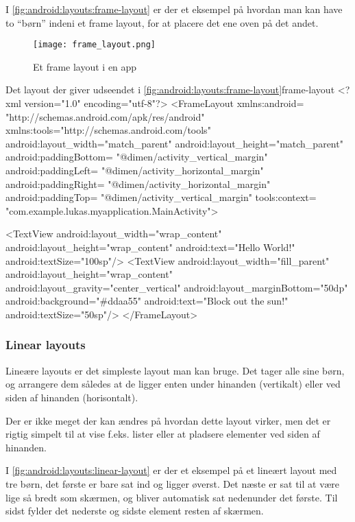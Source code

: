 I \autoref{fig:android:layouts:frame-layout} er der et eksempel på hvordan man 
kan have to ``børn'' indeni et frame layout, for at placere det ene oven på det 
andet.

\begin{figure}[h]
	\begin{center}
		\texttt{[image: frame\_layout.png]}
		\caption{Et frame layout i en app}
		\label{fig:android:layouts:frame-layout}
	\end{center}
\end{figure}

\clearpage

\begin{XmlCode}{Det layout der giver udseendet i \autoref{fig:android:layouts:frame-layout}}{frame-layout}
	<?xml version="1.0" encoding="utf-8"?>
	<FrameLayout 
		xmlns:android=
			"http://schemas.android.com/apk/res/android"
		xmlns:tools="http://schemas.android.com/tools"
		android:layout_width="match_parent"
		android:layout_height="match_parent"
		android:paddingBottom=
			"@dimen/activity_vertical_margin"
		android:paddingLeft=
			"@dimen/activity_horizontal_margin"
		android:paddingRight=
			"@dimen/activity_horizontal_margin"
		android:paddingTop=
			"@dimen/activity_vertical_margin"
		tools:context=
			"com.example.lukas.myapplication.MainActivity">
	
		<TextView
			android:layout_width="wrap_content"
			android:layout_height="wrap_content"
			android:text="Hello World!"
			android:textSize="100sp"/>
		<TextView
			android:layout_width="fill_parent"
			android:layout_height="wrap_content"
			android:layout_gravity="center_vertical"
			android:layout_marginBottom="50dp"
			android:background="#ddaa55"
			android:text="Block out the sun!"
			android:textSize="50sp"/>
	</FrameLayout>
\end{XmlCode}

\subsubsection{Linear layouts}
Lineære layouts er det simpleste layout man kan bruge. Det tager alle sine 
børn, og arrangere dem således at de ligger enten under hinanden (vertikalt) 
eller ved siden af hinanden (horisontalt).

Der er ikke meget der kan ændres på hvordan dette layout virker, men det er 
rigtig simpelt til at vise f.eks. lister eller at pladsere elementer ved siden 
af hinanden.

I \autoref{fig:android:layouts:linear-layout} er der et eksempel på et lineært 
layout med tre børn, det første er bare sat ind og ligger øverst. Det næste er 
sat til at være lige så bredt som skærmen, og bliver automatisk sat nedenunder 
det første. Til sidst fylder det nederste og sidste element resten af skærmen.

